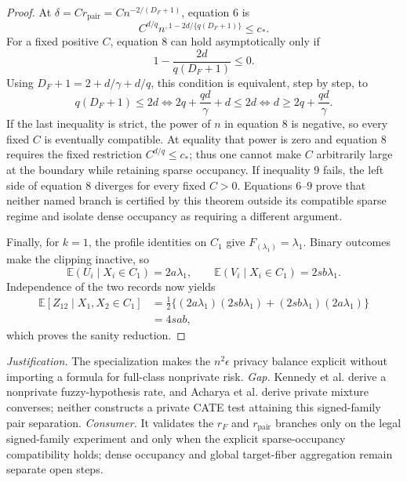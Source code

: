 \documentclass{article}
\begin{document}
\begin{proof}
At \(\delta=Cr_{\mathrm{pair}}=Cn^{-2/(D_F+1)}\), equation \(6\) is
\[
 C^{d/q}n^{,1-2d/\{q(D_F+1)\}}\le c_*. \tag{8}
\]
For a fixed positive \(C\), equation \(8\) can hold asymptotically only if
\[
 1-\frac{2d}{q(D_F+1)}\le0.
\]
Using \(D_F+1=2+d/\gamma+d/q\), this condition is equivalent, step by step, to
\[
 q(D_F+1)\le2d
 \iff 2q+\frac{qd}{\gamma}+d\le2d
 \iff d\ge2q+\frac{qd}{\gamma}. \tag{9}
\]
If the last inequality is strict, the power of \(n\) in equation \(8\) is negative, so every fixed \(C\) is eventually compatible.  At equality that power is zero and equation \(8\) requires the fixed restriction \(C^{d/q}\le c_*\); thus one cannot make \(C\) arbitrarily large at the boundary while retaining sparse occupancy.  If inequality \(9\) fails, the left side of equation \(8\) diverges for every fixed \(C>0\).  Equations \(6\)--\(9\) prove that neither named branch is certified by this theorem outside its compatible sparse regime and isolate dense occupancy as requiring a different argument.

Finally, for \(k=1\), the profile identities on \(C_1\) give \(F_{(\lambda_1)}=\lambda_1\).  Binary outcomes make the clipping inactive, so
\[
 \mathbb E(U_i\mid X_i\in C_1)=2a\lambda_1,
 \qquad
 \mathbb E(V_i\mid X_i\in C_1)=2sb\lambda_1.
\]
Independence of the two records now yields
\[
 \begin{aligned}
 \mathbb E\!\left[Z_{12}\mid X_1,X_2\in C_1\right]
 &=\frac12\{(2a\lambda_1)(2sb\lambda_1)
 +(2sb\lambda_1)(2a\lambda_1)\}\\
 &=4sab,
 \end{aligned}
\]
which proves the sanity reduction.
\end{proof}
\par\smallskip\noindent \textit{Justification.} The specialization makes the \(n^2\epsilon\) privacy balance explicit without importing a formula for full-class nonprivate risk. \textit{Gap.} Kennedy et al. derive a nonprivate fuzzy-hypothesis rate, and Acharya et al. derive private mixture converses; neither constructs a private CATE test attaining this signed-family pair separation. \textit{Consumer.} It validates the \(r_F\) and \(r_{\mathrm{pair}}\) branches only on the legal signed-family experiment and only when the explicit sparse-occupancy compatibility holds; dense occupancy and global target-fiber aggregation remain separate open steps.
\end{document}
